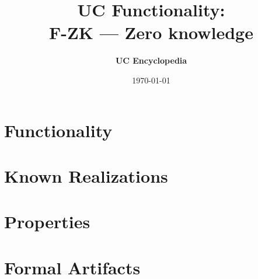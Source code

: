 \documentclass[11pt,a4paper]{article}
\title{\textbf{\Large UC Functionality:}\\[0.2em] \Large F-ZK --- Zero knowledge}
\author{\textbf{UC Encyclopedia}}
\date{\today}
\newtheorem{functionality}{Functionality}
\begin{document}
\maketitle

\begin{abstract}
\end{abstract}

\section{Functionality}

%

\section{Known Realizations}


\section{Properties}


\section{Formal Artifacts}

\end{document}
